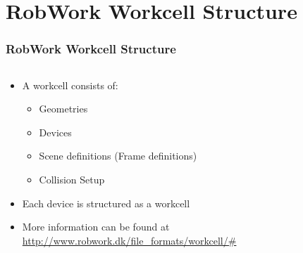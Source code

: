 \documentclass{beamer}
\begin{document}

\section{RobWork Workcell Structure}


\begin{frame}
  \frametitle{RobWork Workcell Structure}
  \begin{columns}
    \begin{column}{0.75\textwidth}
      \begin{itemize}
      \item A workcell consists of:
        \begin{itemize}
        \item Geometries
        \item Devices
        \item Scene definitions (Frame definitions)
        \item Collision Setup
        \end{itemize}
      \item Each device is structured as a workcell
      \item More information can be found at \url{http://www.robwork.dk/file_formats/workcell/\#}
      \end{itemize}
    \end{column}
    \begin{column}{0.25\textwidth}
      \begin{centering}

\end{centering}
\end{column}
\end{columns}
\end{frame}
\end{document}
